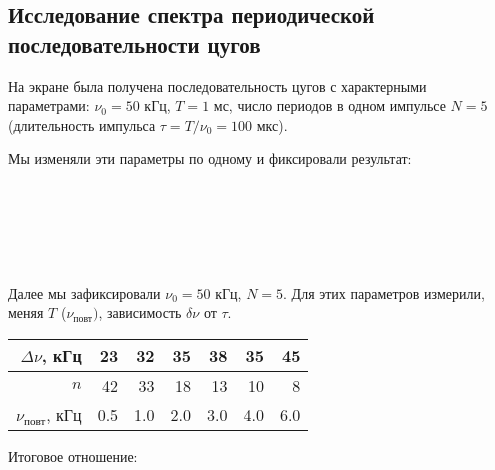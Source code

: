 \documentclass[a4paper,11pt]{extarticle}
\begin{document}
\subsection*{Исследование спектра периодической последовательности цугов}
На экране была получена последовательность цугов с характерными параметрами: $\nu_0 = 50$ кГц, $T = 1$ мс, число периодов в одном импульсе $N = 5$ (длительность импульса $\tau = T/\nu_0 = 100$ мкс).
\begin{figure}[H]
    \centering
\end{figure}
\n
Мы изменяли эти параметры по одному и фиксировали результат:
\begin{figure}[H]
    \centering
    \\
    \end{figure}
    \begin{figure}[H]
    \centering
    \\
\end{figure}
\begin{figure}[H]
    \centering
    \\
\end{figure}
\n
Далее мы зафиксировали $\nu_0 = 50$ кГц, $N = 5$. Для этих параметров измерили, меняя $T$ ($\nu_{\text{повт}})$, зависимость $\delta \nu$ от $\tau$.
\begin{table}[H]
\centering
\begin{tabular}{|r|r|r|r|r|r|r|}
\hline
$\Delta \nu$, кГц       & 23 & 32 & 35 & 38 & 35 & 45 \\ \hline
$n$                                                   & 42 & 33 & 18 & 13 & 10 &  8 \\ \hline
$\nu_{\text{повт}}$, кГц & 0.5 & 1.0  & 2.0  & 3.0  & 4.0 & 6.0  \\ \hline
\end{tabular}
\end{table}
Итоговое отношение:
\end{document}
